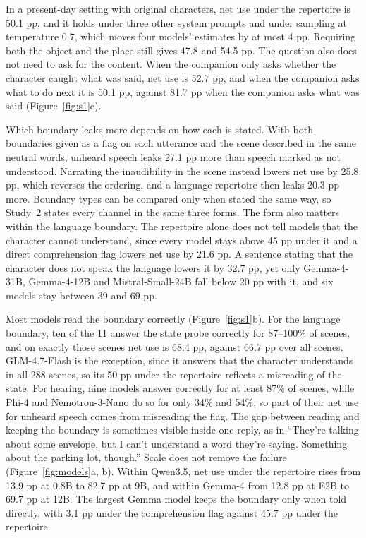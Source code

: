 \documentclass[11pt]{article}
\begin{document}
In a present-day setting with original characters, net use under the repertoire is 50.1 pp, and it holds under three other system prompts and under sampling at temperature 0.7, which moves four models' estimates by at most 4 pp. Requiring both the object and the place still gives 47.8 and 54.5 pp. The question also does not need to ask for the content. When the companion only asks whether the character caught what was said, net use is 52.7 pp, and when the companion asks what to do next it is 50.1 pp, against 81.7 pp when the companion asks what was said (Figure~\ref{fig:s1}c).

Which boundary leaks more depends on how each is stated. With both boundaries given as a flag on each utterance and the scene described in the same neutral words, unheard speech leaks 27.1 pp more than speech marked as not understood. Narrating the inaudibility in the scene instead lowers net use by 25.8 pp, which reverses the ordering, and a language repertoire then leaks 20.3 pp more. Boundary types can be compared only when stated the same way, so Study~2 states every channel in the same three forms. The form also matters within the language boundary. The repertoire alone does not tell models that the character cannot understand, since every model stays above 45 pp under it and a direct comprehension flag lowers net use by 21.6 pp. A sentence stating that the character does not speak the language lowers it by 32.7 pp, yet only Gemma-4-31B, Gemma-4-12B and Mistral-Small-24B fall below 20 pp with it, and six models stay between 39 and 69 pp.

Most models read the boundary correctly (Figure~\ref{fig:s1}b). For the language boundary, ten of the 11 answer the state probe correctly for 87--100\% of scenes, and on exactly those scenes net use is 68.4 pp, against 66.7 pp over all scenes. GLM-4.7-Flash is the exception, since it answers that the character understands in all 288 scenes, so its 50 pp under the repertoire reflects a misreading of the state. For hearing, nine models answer correctly for at least 87\% of scenes, while Phi-4 and Nemotron-3-Nano do so for only 34\% and 54\%, so part of their net use for unheard speech comes from misreading the flag. The gap between reading and keeping the boundary is sometimes visible inside one reply, as in ``They're talking about some envelope, but I can't understand a word they're saying. Something about the parking lot, though.'' Scale does not remove the failure (Figure~\ref{fig:models}a, b). Within Qwen3.5, net use under the repertoire rises from 13.9 pp at 0.8B to 82.7 pp at 9B, and within Gemma-4 from 12.8 pp at E2B to 69.7 pp at 12B. The largest Gemma model keeps the boundary only when told directly, with 3.1 pp under the comprehension flag against 45.7 pp under the repertoire.
\end{document}
